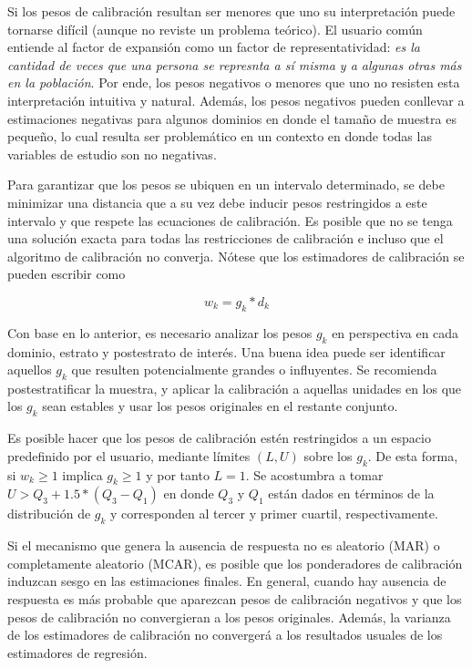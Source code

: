 \documentclass[12pt,spanish,]{book}
\begin{document}
Si los pesos de calibración resultan ser menores que uno su interpretación puede tornarse difícil (aunque no reviste un problema teórico). El usuario común entiende al factor de expansión como un factor de representatividad: \emph{es la cantidad de veces que una persona se represnta a sí misma y a algunas otras más en la población}. Por ende, los pesos negativos o menores que uno no resisten esta interpretación intuitiva y natural. Además, los pesos negativos pueden conllevar a estimaciones negativas para algunos dominios en donde el tamaño de muestra es pequeño, lo cual resulta ser problemático en un contexto en donde todas las variables de estudio son no negativas.

Para garantizar que los pesos se ubiquen en un intervalo determinado, se debe minimizar una distancia que a su vez debe inducir pesos restringidos a este intervalo y que respete las ecuaciones de calibración. Es posible que no se tenga una solución exacta para todas las restricciones de calibración e incluso que el algoritmo de calibración no converja. Nótese que los estimadores de calibración se pueden escribir como

\[
w_k = g_k * d_k
\]

Con base en lo anterior, es necesario analizar los pesos \(g_k\) en perspectiva en cada dominio, estrato y postestrato de interés. Una buena idea puede ser identificar aquellos \(g_k\) que resulten potencialmente grandes o influyentes. Se recomienda postestratificar la muestra, y aplicar la calibración a aquellas unidades en los que los \(g_k\) sean estables y usar los pesos originales en el restante conjunto.

Es posible hacer que los pesos de calibración estén restringidos a un espacio predefinido por el usuario, mediante límites \((L, U)\) sobre los \(g_k\). De esta forma, si \(w_k \geq 1\) implica \(g_k \geq 1\) y por tanto \(L=1\). Se acostumbra a tomar \(U > Q_3 + 1.5 * (Q_3 - Q_1)\) en donde \(Q_3\) y \(Q_1\) están dados en términos de la distribución de \(g_k\) y corresponden al tercer y primer cuartil, respectivamente.

Si el mecanismo que genera la ausencia de respuesta no es aleatorio (MAR) o completamente aleatorio (MCAR), es posible que los ponderadores de calibración induzcan sesgo en las estimaciones finales. En general, cuando hay ausencia de respuesta es más probable que aparezcan pesos de calibración negativos y que los pesos de calibración no convergieran a los pesos originales. Además, la varianza de los estimadores de calibración no convergerá a los resultados usuales de los estimadores de regresión.
\end{document}
